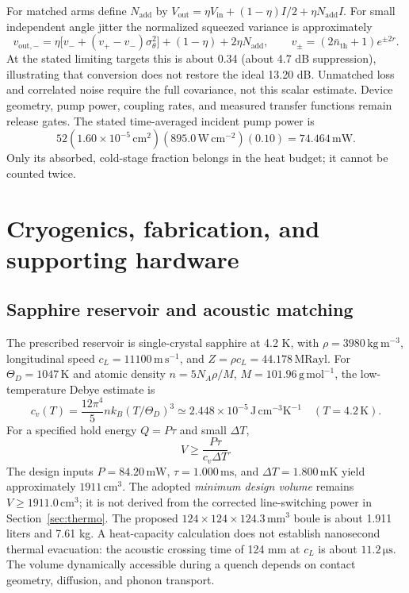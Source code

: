 \documentclass[11pt,a4paper]{article}
\newcommand{\unit}[1]{\,\mathrm{#1}}
\begin{document}
For matched arms define $N_{\mathrm{add}}$ by
$V_{\mathrm{out}}=\eta V_{\mathrm{in}}+(1-\eta)I/2+\eta N_{\mathrm{add}}I$.
For small independent angle jitter the normalized squeezed variance is approximately
\[
 v_{\mathrm{out},-}=\eta\bigl[v_-+(v_+-v_-)\sigma_\theta^2\bigr]
 +(1-\eta)+2\eta N_{\mathrm{add}},\qquad
 v_\pm=(2\bar n_{\mathrm{th}}+1)e^{\pm2r}.
\]
At the stated limiting targets this is about 0.34 (about 4.7 dB suppression), illustrating
that conversion does not restore the ideal 13.20 dB. Unmatched loss and correlated noise
require the full covariance, not this scalar estimate. Device geometry, pump power,
coupling rates, and measured transfer functions remain release gates.
The stated time-averaged incident pump power is
\[
 52(1.60\times10^{-5}\unit{cm^2})(895.0\unit{W\,cm^{-2}})(0.10)
 =74.464\unit{mW}.
\]
Only its absorbed, cold-stage fraction belongs in the heat budget; it cannot be counted twice.

\section{Cryogenics, fabrication, and supporting hardware}
\label{sec:cryo}
\subsection{Sapphire reservoir and acoustic matching}
\label{sec:sapphire}
The prescribed reservoir is single-crystal sapphire at 4.2 K, with
$\rho=3980\unit{kg\,m^{-3}}$, longitudinal speed $c_L=11100\unit{m\,s^{-1}}$,
and $Z=\rho c_L=44.178\unit{MRayl}$. For $\Theta_D=1047\unit{K}$ and atomic density
$n=5N_A\rho/M$, $M=101.96\unit{g\,mol^{-1}}$, the low-temperature Debye estimate is
\[
 c_v(T)=\frac{12\pi^4}{5}nk_B(T/\Theta_D)^3\simeq
 2.448\times10^{-5}\unit{J\,cm^{-3}K^{-1}}\quad(T=4.2\unit K).
\]
For a specified hold energy $Q=P\tau$ and small $\Delta T$,
\[
 V\ge\frac{P\tau}{c_v\Delta T}.
\]
The design inputs $P=84.20\unit{mW}$, $\tau=1.000\unit{ms}$, and
$\Delta T=1.800\unit{mK}$ yield approximately $1911\unit{cm^3}$.
The adopted \emph{minimum design volume} remains $V\ge1911.0\unit{cm^3}$;
it is not derived from the corrected line-switching power in Section~\ref{sec:thermo}.
The proposed $124\times124\times124.3\unit{mm^3}$ boule is about 1.911 liters and 7.61 kg.
A heat-capacity calculation does not establish nanosecond thermal evacuation: the acoustic
crossing time of 124 mm at $c_L$ is about $11.2\unit{\mu s}$. The volume dynamically
accessible during a quench depends on contact geometry, diffusion, and phonon transport.
\end{document}
